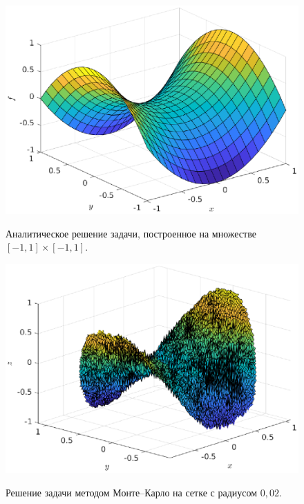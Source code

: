 \begin{figure}[t]
        \noindent
        \centering
        {
                \includegraphics[width=120mm]{task_08/anal.eps}
        }
        \caption{Аналитическое решение задачи, построенное на множестве $[-1,1]\times[-1,1]$.}
\end{figure}
\begin{figure}[b]
        \noindent
        \centering
        {
                \includegraphics[width=120mm]{task_08/prac.eps}
        }
        \caption{Решение задачи методом Монте--Карло на сетке с радиусом $0,\!02$.}
\end{figure}